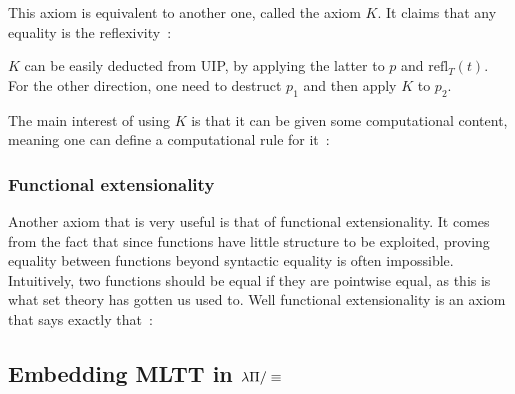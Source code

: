 \begin{center}\begin{prooftree}
     
     
\end{prooftree}\end{center}

This axiom is equivalent to another one, called the axiom $K$. It claims that
any equality is the reflexivity~:

\begin{center}\begin{prooftree}
     
\end{prooftree}\end{center}

$K$ can be easily deducted from UIP, by applying the latter to $p$ and
$\text{refl}_{T}(t)$. For the other direction, one need to destruct $p_{1}$ and
then apply $K$ to $p_{2}$.

The main interest of using $K$ is that it can be given some computational
content, meaning one can define a computational rule for it~:

\begin{center}\begin{prooftree}
\end{prooftree}\end{center}

\subsubsection{Functional extensionality}\label{funext}

Another axiom that is very useful is that of functional extensionality. It comes
from the fact that since functions have little structure to be exploited,
proving equality between functions beyond syntactic equality is often
impossible. Intuitively, two functions should be equal if they are pointwise
equal, as this is what set theory has gotten us used to. Well functional
extensionality is an axiom that says exactly that~:

\begin{center}\begin{prooftree}
\end{prooftree}\end{center}

\subsection{Embedding MLTT in $\lp$}
